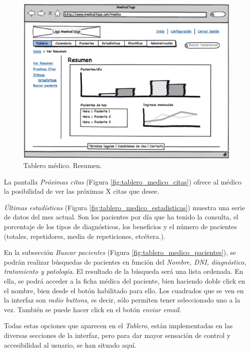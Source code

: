 			\begin{figure}[H]
			  \centering
			    \includegraphics[width=12cm]{img/eps/8_Dashboard_Medico_Tablero.eps}
			  \caption{Tablero médico. Resumen.}
			  \label{fig:tablero_medico_resumen}
			\end{figure}
			
			La pantalla \textit{Próximas citas} (Figura \ref{fig:tablero_medico_citas}) ofrece al médico la posibilidad de ver las próximas X citas que desee.	
			
			\textit{Últimas estadísticas} (Figura \ref{fig:tablero_medico_estadisticas}) muestra una serie de datos del mes actual. Son los pacientes por día que ha tenido la consulta, el porcentaje de los tipos de diagnósticos, los beneficios y el número de pacientes (totales, repetidores, media de repeticiones, etcétera.).
		
			En la subsección \textit{Buscar pacientes} (Figura \ref{fig:tablero_medico_pacientes}), se podrán realizar búsquedas de pacientes en función del \textit{Nombre, DNI, diagnóstico, tratamiento y patología}. El resultado de la búsqueda será una lista ordenada. En ella, se podrá acceder a la ficha médica del paciente, bien haciendo doble click en el nombre, bien desde el botón habilitado para ello. Los cuadrados que se ven en la interfaz son \textit{radio buttons}, es decir, sólo permiten tener seleccionado uno a la vez. También se puede hacer click en el botón \textit{enviar email}.
			
			Todas estas opciones que aparecen en el \textit{Tablero}, están implementadas en las diversas secciones de la interfaz, pero para dar mayor sensación de control y accesibilidad al usuario, se han situado aquí.
			
